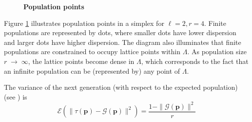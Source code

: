 \begin{figure}[H]
\begin{center}
\hspace{4pt}
\caption{\textbf{Population points} }
\label{tetra_popn}
\end{center}
\end{figure}

Figure \ref{tetra_popn} illustrates population points in a simplex for $\ell  =  2,  r  =  4$. 
Finite populations are represented by dots, 
where smaller dots have lower dispersion and larger dots have higher dispersion. 
The diagram also illuminates that finite populations are constrained to occupy lattice points 
within $\Lambda$. As population size $r \;\to\; \infty$, the lattice points become dense in $\Lambda$, 
which corresponds to the fact that an infinite population can be (represented by) any point of $\Lambda$.  

The variance of the next generation (with respect to the expected population) (see \cite{Vose1999}) is 
\begin{equation}
\label{RHSvariance}
\mathcal{E}(\| \tau (\bm{p}) - \mathcal{G}(\bm{p}) \|^2) = \frac{1 - \|\mathcal{G}(\bm{p})\|^2}{r}
\end{equation}

